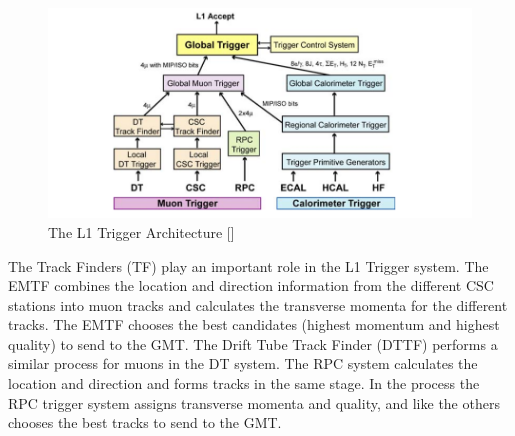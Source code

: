 \begin{figure}[h!]
  \centering
  \includegraphics[width=5in]{images/L1_Trigger.png}
  \caption
   {The L1 Trigger Architecture [\cite{cmsexp}]}
  \label{fig:l1trigarch}
\end{figure}

The Track Finders (TF) play an important role in the L1 Trigger system. The EMTF combines the location and direction information from the different CSC stations into muon tracks and calculates the transverse momenta for the different tracks. The EMTF chooses the best candidates (highest momentum and highest quality) to send to the GMT. The Drift Tube Track Finder (DTTF) performs a similar process for muons in the DT system. The RPC system calculates the location and direction and forms tracks in the same stage. In the process the RPC trigger system assigns transverse momenta and quality, and like the others chooses the best tracks to send to the GMT.
